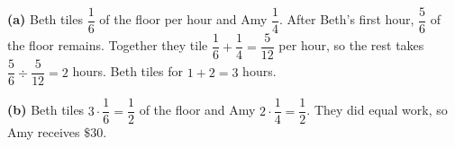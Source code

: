 \textbf{(a)} Beth tiles $\dfrac16$ of the floor per hour and Amy $\dfrac14$. After Beth's first hour, $\dfrac56$ of the floor remains. Together they tile $\dfrac16+\dfrac14=\dfrac5{12}$ per hour, so the rest takes $\dfrac56\div\dfrac5{12}=2$ hours. Beth tiles for $1+2=\boxed{3}$ hours.

\textbf{(b)} Beth tiles $3\cdot\dfrac16=\dfrac12$ of the floor and Amy $2\cdot\dfrac14=\dfrac12$. They did equal work, so Amy receives $\boxed{\$30}$.
